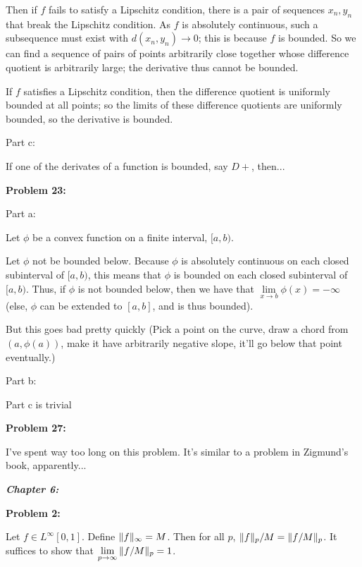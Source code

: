 \documentclass[a4paper,12pt]{article}
\begin{document}
Then if $f$ fails to satisfy a Lipschitz condition, there is a pair of sequences $x_n,y_n$ that break the Lipschitz condition. As $f$ is absolutely continuous, such a subsequence must exist with $d(x_n,y_n) \to 0$; this is because $f$ is bounded. So we can find a sequence of pairs of points arbitrarily close together whose difference quotient is arbitrarily large; the derivative thus cannot be bounded.

If $f$ satisfies a Lipschitz condition, then the difference quotient is uniformly bounded at all points; so the limits of these difference quotients are uniformly bounded, so the derivative is bounded.

\shunt

Part c:

If one of the derivates of a function is bounded, say $D+$, then...

\shunt

{\bf Problem 23:}

Part a:

Let $\phi$ be a convex function on a finite interval, $[a,b)$.

Let $\phi$ not be bounded below. Because $\phi$ is absolutely continuous on each closed subinterval of $[a,b)$, this means that $\phi$ is bounded on each closed subinterval of $[a,b)$. Thus, if $\phi$ is not bounded below, then we have that $\lim\limits_{x \to b} \phi(x) = -\infty$ (else, $\phi$ can be extended to $[a,b]$, and is thus bounded).

But this goes bad pretty quickly (Pick a point on the curve, draw a chord from $(a, \phi(a))$, make it have arbitrarily negative slope, it'll go below that point eventually.)

\shunt

Part b:

\shunt

Part c is trivial

\shunt

{\bf Problem 27:}

I've spent way too long on this problem. It's similar to a problem in Zigmund's book, apparently...

\pagebreak

{\Huge{\textit{\textbf{Chapter 6:}}}}

\shunt

{\bf Problem 2:}

Let $f \in L^\infty[0,1]$. Define $\|f\|_\infty = M$. Then for all $p$, $\|f\|_p/M = \|f/M\|_p$. It suffices to show that $\lim\limits_{p \to \infty} \|f/M\|_p = 1$.
\end{document}
